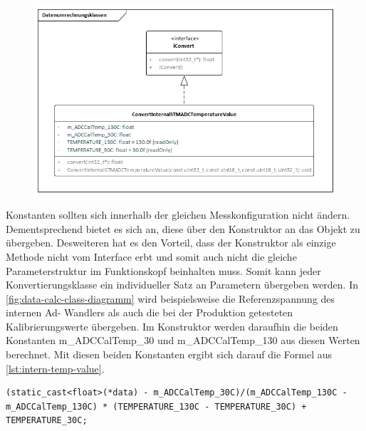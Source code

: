 \begin{figure}[!htb]
    \begin{center}
        \includegraphics[width=1\textwidth]{Figures/Chapter_3/Datenumrechnungsklassen.png}
        
        \label{fig:data-calc-class-diagramm}
    \end {center}
\end{figure}

Konstanten sollten sich innerhalb der gleichen Messkonfiguration nicht ändern.
Dementsprechend bietet es sich an, diese über den Konstruktor an das Objekt zu übergeben.
Desweiteren hat es den Vorteil, dass der Konstruktor als einzige \glqq Methode \grqq nicht vom Interface erbt und somit auch nicht die gleiche Parameterstruktur im Funktionskopf beinhalten muss.
Somit kann jeder Konvertierungsklasse ein individueller Satz an Parametern übergeben werden.\newline
In \autoref{fig:data-calc-class-diagramm} wird beispielsweise die Referenzspannung des internen Ad- Wandlers als auch die bei der Produktion getesteten Kalibrierungswerte übergeben.
Im Konstruktor werden daraufhin die beiden Konstanten m\_ADCCalTemp\_30 und m\_ADCCalTemp\_130 aus diesen Werten berechnet.
Mit diesen beiden Konstanten ergibt sich darauf die Formel aus \autoref{lst:intern-temp-value}.

\begin{lstlisting}[caption={Formel zur Berechnung der Betriebstemperatur}, label=lst:intern-temp-value]
(static_cast<float>(*data) - m_ADCCalTemp_30C)/(m_ADCCalTemp_130C - m_ADCCalTemp_130C) * (TEMPERATURE_130C - TEMPERATURE_30C) + TEMPERATURE_30C;
\end{lstlisting}

